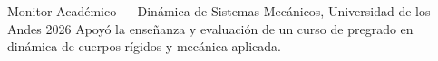 \cvsection{\ExperienceLabel}

\cvexperience
{Monitor Académico --- Dinámica de Sistemas Mecánicos, Universidad de los Andes}
{2026}
{Apoyó la enseñanza y evaluación de un curso de pregrado en dinámica de cuerpos rígidos y mecánica aplicada.}
